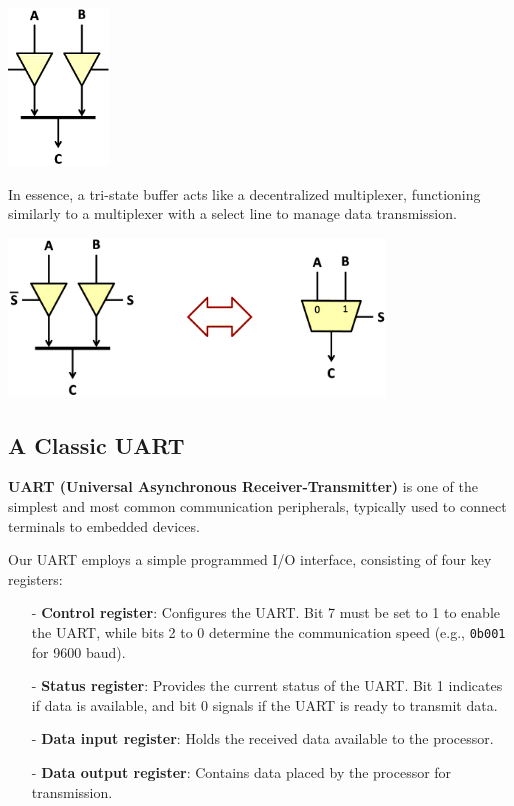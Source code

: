 \begin{center} \includegraphics[width=0.20\textwidth]{chapters/chapter2b/images/tris1.png} \end{center}

In essence, a tri-state buffer acts like a decentralized multiplexer, functioning similarly to a multiplexer with a select line to manage data transmission.

\begin{center} \includegraphics[width=0.75\textwidth]{chapters/chapter2b/images/tris2.png} \end{center}
\newpage
\subsection{A Classic UART}

\textbf{UART (Universal Asynchronous Receiver-Transmitter)} is one of the simplest and most common communication peripherals, typically used to connect terminals to embedded devices. 

Our UART employs a simple programmed I/O interface, consisting of four key registers:

\begin{itemize}
    \item[-] \textbf{Control register}: Configures the UART. Bit 7 must be set to 1 to enable the UART, while bits 2 to 0 determine the communication speed (e.g., \texttt{0b001} for 9600 baud).
    \item[-] \textbf{Status register}: Provides the current status of the UART. Bit 1 indicates if data is available, and bit 0 signals if the UART is ready to transmit data.
    \item[-] \textbf{Data input register}: Holds the received data available to the processor.
    \item[-] \textbf{Data output register}: Contains data placed by the processor for transmission.
\end{itemize}


